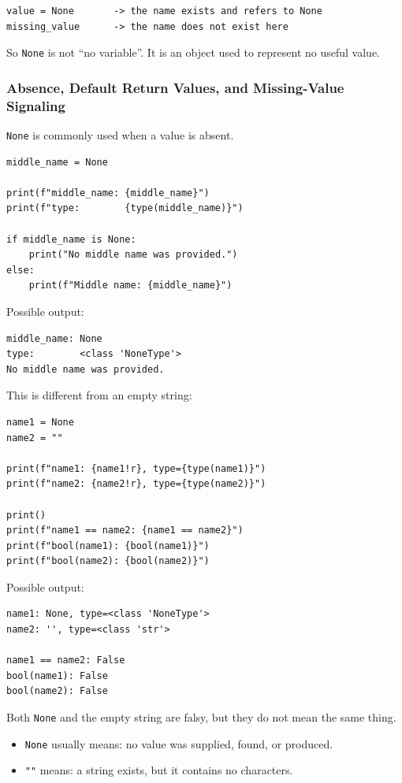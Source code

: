 \begin{verbatim}
value = None       -> the name exists and refers to None
missing_value      -> the name does not exist here
\end{verbatim}

So \texttt{None} is not ``no variable''. It is an object used to represent no useful value.

\subsubsection{Absence, Default Return Values, and Missing-Value Signaling}

\texttt{None} is commonly used when a value is absent.

\begin{verbatim}
middle_name = None

print(f"middle_name: {middle_name}")
print(f"type:        {type(middle_name)}")

if middle_name is None:
    print("No middle name was provided.")
else:
    print(f"Middle name: {middle_name}")
\end{verbatim}

Possible output:

\begin{verbatim}
middle_name: None
type:        <class 'NoneType'>
No middle name was provided.
\end{verbatim}

This is different from an empty string:

\begin{verbatim}
name1 = None
name2 = ""

print(f"name1: {name1!r}, type={type(name1)}")
print(f"name2: {name2!r}, type={type(name2)}")

print()
print(f"name1 == name2: {name1 == name2}")
print(f"bool(name1): {bool(name1)}")
print(f"bool(name2): {bool(name2)}")
\end{verbatim}

Possible output:

\begin{verbatim}
name1: None, type=<class 'NoneType'>
name2: '', type=<class 'str'>

name1 == name2: False
bool(name1): False
bool(name2): False
\end{verbatim}

Both \texttt{None} and the empty string are falsy, but they do not mean the same thing.

\begin{itemize}
    \item \texttt{None} usually means: no value was supplied, found, or produced.
    \item \texttt{""} means: a string exists, but it contains no characters.
\end{itemize}

